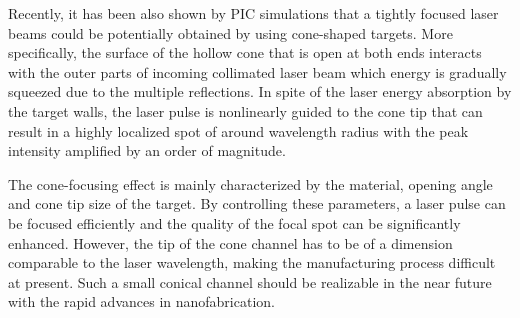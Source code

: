 Recently, it has been also shown by PIC simulations that a tightly focused laser beams could be potentially obtained by using cone-shaped targets. More specifically, the surface of the hollow cone that is open at both ends interacts with the outer parts of incoming collimated laser beam which energy is gradually squeezed due to the multiple reflections. In spite of the laser energy absorption by the target walls, the laser pulse is nonlinearly guided to the cone tip that can result in a highly localized spot of around wavelength radius with the peak intensity amplified by an order of magnitude.

The cone-focusing effect is mainly characterized by the material, opening angle and cone tip size of the target. By controlling these parameters, a laser pulse can be focused efficiently and the quality of the focal spot can be significantly enhanced. However, the tip of the cone channel has to be of a dimension comparable to the laser wavelength, making the manufacturing process difficult at present. Such a small conical channel should be realizable in the near future with the rapid advances in nanofabrication.